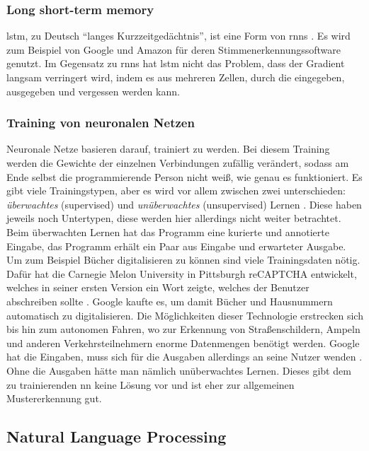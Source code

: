 \subsubsection{Long short-term memory}

\ac{lstm}, zu Deutsch \enquote{langes Kurzzeitgedächtnis}, ist eine Form von \acp{rnn} \citep{lstm}.
Es wird zum Beispiel von Google und Amazon für deren Stimmenerkennungssoftware genutzt.
Im Gegensatz zu \acp{rnn} hat \ac{lstm} nicht das Problem, dass der Gradient langsam verringert wird,
indem es aus mehreren Zellen, durch die eingegeben, ausgegeben und vergessen werden kann.

\subsubsection{Training von neuronalen Netzen}

Neuronale Netze basieren darauf, trainiert zu werden.
Bei diesem Training werden die Gewichte der einzelnen Verbindungen zufällig verändert, sodass am Ende selbst die programmierende Person nicht weiß, wie genau es funktioniert.
Es gibt viele Trainingstypen, aber es wird vor allem zwischen zwei unterschieden: \emph{überwachtes} (supervised) und \emph{unüberwachtes} (unsupervised) Lernen \citep{mllearning}.
Diese haben jeweils noch Untertypen, diese werden hier allerdings nicht weiter betrachtet.
Beim überwachten Lernen hat das Programm eine kurierte und annotierte Eingabe, das Programm erhält ein Paar aus Eingabe und erwarteter Ausgabe.
Um zum Beispiel Bücher digitalisieren zu können sind viele Trainingsdaten nötig.
Dafür hat die Carnegie Melon University in Pittsburgh reCAPTCHA entwickelt, welches in seiner ersten Version ein Wort zeigte, welches der Benutzer abschreiben sollte \citep{recaptchabooks}.
Google kaufte es, um damit Bücher und Hausnummern automatisch zu digitalisieren.
Die Möglichkeiten dieser Technologie erstrecken sich bis hin zum autonomen Fahren, wo zur Erkennung von Straßenschildern, Ampeln und anderen Verkehrsteilnehmern enorme Datenmengen benötigt werden.
Google hat die Eingaben, muss sich für die Ausgaben allerdings an seine Nutzer wenden \citep{recaptchaav}.
Ohne die Ausgaben hätte man nämlich unüberwachtes Lernen.
Dieses gibt dem zu trainierenden \ac{nn} keine Lösung vor und ist eher zur allgemeinen Mustererkennung gut.

\subsection{Natural Language Processing}


